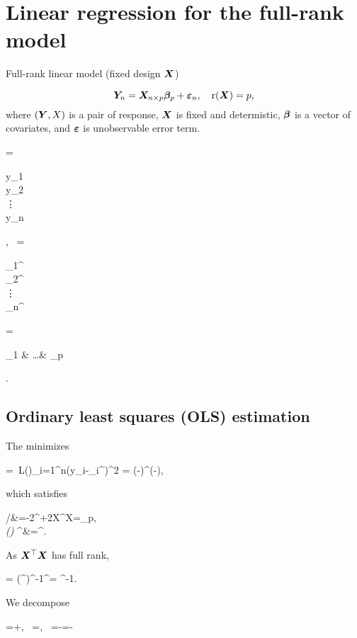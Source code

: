 \documentclass[10pt,a4paper]{book}
\begin{document}
\section{Linear regression for the full-rank model}\label{sec:LR_full_rank}
\begin{defbox}{Full-rank linear model (fixed design ${\boldsymbol X}$)}
	\begin{definition}\label{def:LR_full_rank}
		\begin{equation}\label{eq:LR_mat}
			{\boldsymbol Y}_{n}={\boldsymbol X}_{n\times p}{\boldsymbol\beta}_{p}+{\boldsymbol\varepsilon}_n, \quad \mathrm{r}({\boldsymbol X})=p,
		\end{equation}
		where $({\boldsymbol Y},X)$ is a pair of response, ${\boldsymbol X}$ is fixed and determistic, ${\boldsymbol\beta}$ is a vector of covariates, and ${\boldsymbol\varepsilon}$ is unobservable error term.   
		\begin{sequation*}
			\Y=\begin{pmatrix}
				y_1 \\ y_2 \\ \vdots \\ y_n
			\end{pmatrix}, \ 
			\X=\begin{pmatrix}
				\x_1^\TT \\ \x_2^\TT \\ \vdots \\ \x_n^\TT
			\end{pmatrix}=\begin{pmatrix}
				\X_1 & \ldots & \X_p
			\end{pmatrix}.
		\end{sequation*}
	\end{definition}
\end{defbox}

\subsection{Ordinary least squares (OLS) estimation}\label{sec:LR_full_rank_OLS}

The  minimizes 
\begin{salign*}
	\hat{\bab}=\ L(\bab)\equiv \sum_{i=1}^{n}(y_i-\x_i^\TT\bab)^2 = (\Y-\X\bab)^\TT (\Y-\X\bab),
\end{salign*}
which satisfies 
\begin{salign*}
	 /{\partial\bab}&=-2\X^\TT\Y+2X^\TT X\bab=\0_p, \\ 
	\textit{(\red{Normal equation})} \qquad \X^\TT \Y&=\X^\TT \X\hat{\bab}.
\end{salign*}
As ${\boldsymbol X}^\top{\boldsymbol X}$ has full rank,
\begin{salign}\label{eq:LR_OLSE}
	\hat{\bab} = (\X^\TT\X)^{-1}\X^\TT \Y = ^{-1}.
\end{salign} 
We decompose
\begin{salign*}
	\Y=\hat{\Y}+\hat{\bave}, \quad
	 \ \hat{\Y}=\X\hat{\bab}, \quad
	 \ \hat{\bave}=\Y-\hat{\Y}=\Y-\X\hat{\bab}
\end{salign*}
\end{document}
